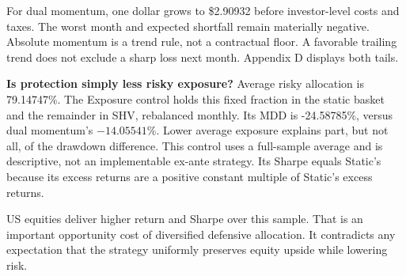 \documentclass[11pt,letterpaper]{article}
\begin{document}
For dual momentum, one dollar grows to \$2.90932 before investor-level costs and taxes. The worst month and expected shortfall remain materially negative. Absolute momentum is a trend rule, not a contractual floor. A favorable trailing trend does not exclude a sharp loss next month. Appendix D displays both tails.

\textbf{Is protection simply less risky exposure?} Average risky allocation is 79.14747\%. The Exposure control holds this fixed fraction in the static basket and the remainder in SHV, rebalanced monthly. Its MDD is -24.58785\%, versus dual momentum's \(-14.05541\%\). Lower average exposure explains part, but not all, of the drawdown difference. This control uses a full-sample average and is descriptive, not an implementable ex-ante strategy. Its Sharpe equals Static's because its excess returns are a positive constant multiple of Static's excess returns.

US equities deliver higher return and Sharpe over this sample. That is an important opportunity cost of diversified defensive allocation. It contradicts any expectation that the strategy uniformly preserves equity upside while lowering risk.

\newpage
\end{document}
